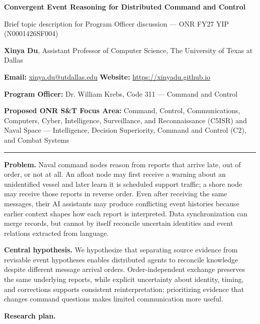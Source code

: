 \documentclass[11pt,letterpaper]{article}
\newcommand{\head}[1]{\textbf{#1}\enspace}
\newcommand{\POline}{Dr. William Krebs, Code 311 --- Command and Control}
\newcommand{\FocusArea}{Command, Control, Communications, Computers, Cyber, Intelligence, Surveillance, and Reconnaissance (C5ISR) and Naval Space --- Intelligence, Decision Superiority, Command and Control (C2), and Combat Systems}
\begin{document}
\begin{center}
{\fontsize{14}{16}\selectfont\bfseries Convergent Event Reasoning for Distributed Command and Control\par}
\vspace{2pt}
{\small Brief topic description for Program Officer discussion --- ONR FY27 YIP (N0001426SF004)}
\end{center}
\vspace{-2pt}
{\small \textbf{Xinya Du}, Assistant Professor of Computer Science, The University of Texas at Dallas\par
\textbf{Email:} \href{mailto:xinya.du@utdallas.edu}{xinya.du@utdallas.edu} \quad \textbf{Website:} \href{https://xinyadu.github.io}{https://xinyadu.github.io}\par
\textbf{Program Officer:} \POline\par
\textbf{Proposed ONR S\&T Focus Area:} \FocusArea\par}
\vspace{2pt}\hrule\vspace{5pt}
\head{Problem.} Naval command nodes reason from reports that arrive late, out of order, or not at all. An afloat node may first receive a warning about an unidentified vessel and later learn it is scheduled support traffic; a shore node may receive those reports in reverse order. Even after receiving the same messages, their AI assistants may produce conflicting event histories because earlier context shapes how each report is interpreted. Data synchronization can merge records, but cannot by itself reconcile uncertain identities and event relations extracted from language.
\par\head{Central hypothesis.} We hypothesize that separating source evidence from revisable event hypotheses enables distributed agents to reconcile knowledge despite different message arrival orders. Order-independent exchange preserves the same underlying reports, while explicit uncertainty about identity, timing, and corrections supports consistent reinterpretation; prioritizing evidence that changes command questions makes limited communication more useful.
\par\head{Research plan.}
\end{document}
